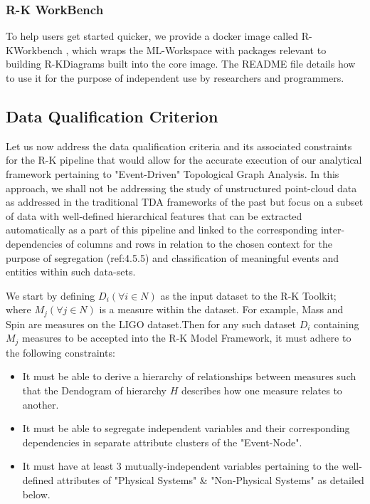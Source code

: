 \subsubsection{R-K WorkBench}

To help users get started quicker, we provide a docker image called R-KWorkbench \cite{andorsk_2021_andorskrkworkbench}, which wraps the ML-Workspace \cite{mltooling_2021_mltoolingmlworkspace} with packages relevant to building R-KDiagrams built into the core image. The README file details how to use it for the purpose of independent use by researchers and programmers. 

\subsection{Data Qualification Criterion}

Let us now address the data qualification criteria and its associated constraints for the R-K pipeline that would allow for the accurate execution of our analytical framework pertaining to "Event-Driven" Topological Graph Analysis. In this approach, we shall not be addressing the study of unstructured point-cloud data as addressed in the traditional TDA frameworks of the past \cite{01.9_2007MapperPBG} \cite{02_carlsson2009topology} \cite{02.3_2017introductionTDA} but focus on a subset of data with well-defined hierarchical features that can be extracted automatically as a part of this pipeline and linked to the corresponding inter-dependencies of columns and rows in relation to the chosen context for the purpose of segregation (ref:4.5.5) and classification of meaningful events and entities within such data-sets.

We start by defining $D_i (\forall i \in N)$ as the input dataset to the R-K Toolkit; where $M_j (\forall j \in N)$ is a measure within the dataset. For example, Mass and Spin are measures on the LIGO dataset.\cite{00_LIGOOpenSciData}Then for any such dataset $D_i$ containing $M_j$ measures to be accepted into the R-K Model Framework, it must adhere to the following constraints:

\begin{itemize}
	\item It must be able to derive a hierarchy of relationships between measures such that the Dendogram of hierarchy $H$ describes how one measure relates to another.
	\item It must be able to segregate independent variables and their corresponding dependencies in separate attribute clusters of the "Event-Node".
	\item It must have at least 3 mutually-independent variables pertaining to the well-defined attributes of "Physical Systems" \&  "Non-Physical Systems" as detailed below.
\end{itemize}

